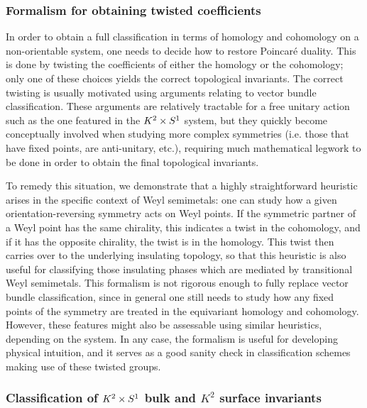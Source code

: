 \subsubsection{Formalism for obtaining twisted coefficients}

In order to obtain a full classification in terms of homology and cohomology on a non-orientable system, one needs to decide how to restore Poincaré duality. This is done by twisting the coefficients of either the homology or the cohomology; only one of these choices yields the correct topological invariants. The correct twisting is usually motivated using arguments relating to vector bundle classification. These arguments are relatively tractable for a free unitary action such as the one featured in the $K^2\times S^1$ system, but they quickly become conceptually involved when studying more complex symmetries (i.e. those that have fixed points, are anti-unitary, etc.), requiring much mathematical legwork to be done in order to obtain the final topological invariants.

To remedy this situation, we demonstrate that a highly straightforward heuristic arises in the specific context of Weyl semimetals: one can study how a given orientation-reversing symmetry acts on Weyl points. If the symmetric partner of a Weyl point has the same chirality, this indicates a twist in the cohomology, and if it has the opposite chirality, the twist is in the homology. This twist then carries over to the underlying insulating topology, so that this heuristic is also useful for classifying those insulating phases which are mediated by transitional Weyl semimetals. This formalism is not rigorous enough to fully replace vector bundle classification, since in general one still needs to study how any fixed points of the symmetry are treated in the equivariant homology and cohomology. However, these features might also be assessable using similar heuristics, depending on the system. In any case, the formalism is useful for developing physical intuition, and it serves as a good sanity check in classification schemes making use of these twisted groups.

\subsubsection{Classification of $K^2\times S^1$ bulk and $K^2$ surface invariants}

